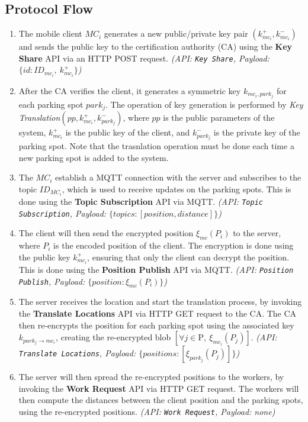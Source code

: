 \documentclass[12pt,a4paper,twoside]{book}
\begin{document}
\subsection{Protocol Flow}
\begin{enumerate}
    \item The mobile client $MC_i$ generates a new public/private key pair $(k_{mc_i}^+, k_{mc_i}^-)$ and sends the public key to the certification authority (CA) using the \textbf{Key Share} API via an HTTP POST request. \emph{(API: \texttt{Key Share}, Payload: $\{id: ID_{mc_i},\ k_{mc_i}^+\}$)}
    \item After the CA verifies the client, it generates a symmetric key $k_{mc_i, park_j}$ for each parking spot $park_j$. The operation of key generation is performed by \emph{Key Translation}$(pp, k_{mc_i}^+, k_{park_j}^-)$, where $pp$ is the public parameters of the system, $k_{mc_i}^+$ is the public key of the client, and $k_{park_j}^-$ is the private key of the parking spot. Note that the trasnlation operation must be done each time a new parking spot is added to the system.
    \item The $MC_i$ establish a MQTT connection with the server and subscribes to the topic $ID_{MC_i}$, which is used to receive updates on the parking spots. This is done using the \textbf{Topic Subscription} API via MQTT. \emph{(API: \texttt{Topic Subscription}, Payload: $\{topics: [position, distance]\}$)}
    \item The client will then send the encrypted position $\xi_{mc}(P_i)$ to the server, where $P_i$ is the encoded position of the client. The encryption is done using the public key $k_{mc_i}^+$, ensuring that only the client can decrypt the position. This is done using the \textbf{Position Publish} API via MQTT. \emph{(API: \texttt{Position Publish}, Payload: $\{position: \xi_{mc}(P_i)\}$)}
    \item The server receives the location and start the translation process, by invoking the \textbf{Translate Locations} API via HTTP GET request to the CA. The CA then re-encrypts the position for each parking spot using the associated key $k_{park_j \to mc_i}$, creating the re-encrypted blob $[\forall j \in \text{P},\ \xi_{mc_i}(P_j)]$. \emph{(API: \texttt{Translate Locations}, Payload: $\{positions: [\xi_{park_j}(P_j)]\}$)}
    \item The server will then spread the re-encrypted positions to the workers, by invoking the \textbf{Work Request} API via HTTP GET request. The workers will then compute the distances between the client position and the parking spots, using the re-encrypted positions. \emph{(API: \texttt{Work Request}, Payload: none)}

\end{enumerate}
\end{document}
